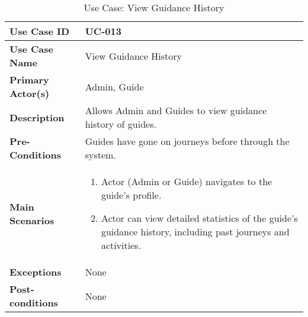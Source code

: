 \begin{table}[ht]
    \centering
    \begin{tabular}{|l|p{}|}
        \hline
        \textbf{Use Case ID} & UC-013\\
        \hline
        \textbf{Use Case Name} & View Guidance History \\
        \hline
        \textbf{Primary Actor(s)} & Admin, Guide \\
        \hline
        \textbf{Description} & Allows Admin and Guides to view guidance history of guides. \\
        \hline
        \textbf{Pre-Conditions} & Guides have gone on journeys before through the system. \\
        \hline
        \textbf{Main Scenarios} & 
        \begin{enumerate}[label=\arabic*.,itemsep=0pt]
            \item Actor (Admin or Guide) navigates to the guide's profile.
            \item Actor can view detailed statistics of the guide's guidance history, including past journeys and activities.
        \end{enumerate} \\
        \hline
        \textbf{Exceptions} & None \\
        \hline
        \textbf{Post-conditions} & None \\
        \hline
    \end{tabular}
    \label{tab:use-case-view-guidance-history}
    \caption{Use Case: View Guidance History}
\end{table}

